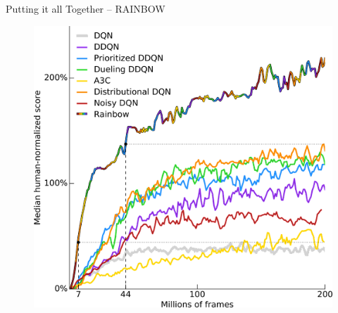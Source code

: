 \documentclass[aspectratio=169]{../latex_main/tntbeamer}  %
\begin{document}

\begin{frame}[c]{Putting it all Together -- RAINBOW ~}
	
	\begin{figure}
	    \centering
	    \includegraphics[width=.4\linewidth]{w06_deep_rl/images/rainbow.png}
	\end{figure}
	
\end{frame}
\end{document}
